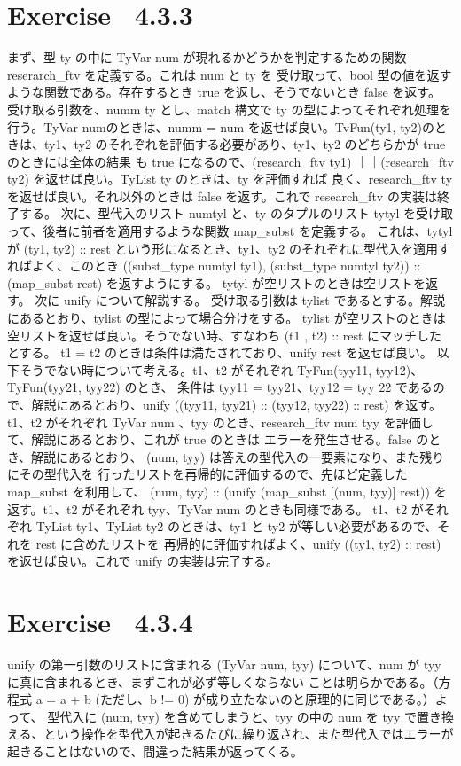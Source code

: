 \documentclass{jreport}
\begin{document}
\section{Exercise \ 4.3.3}
まず、型 ty の中に TyVar num が現れるかどうかを判定するための関数 reserarch\_ftv を定義する。これは num と ty を
受け取って、bool 型の値を返すような関数である。存在するとき true を返し、そうでないとき false を返す。
受け取る引数を、numm ty とし、match 構文で ty の型によってそれぞれ処理を行う。TyVar numのときは、numm = num を返せば良い。TvFun(ty1, ty2)のときは、ty1、ty2 のそれぞれを評価する必要があり、ty1、ty2 のどちらかが true のときには全体の結果
も true になるので、(research\_ftv ty1) ｜｜(research\_ftv ty2) を返せば良い。TyList ty のときは、ty を評価すれば
良く、research\_ftv ty を返せば良い。それ以外のときは false を返す。これで research\_ftv の実装は終了する。
次に、型代入のリスト numtyl と、ty のタプルのリスト tytyl を受け取って、後者に前者を適用するような関数 map\_subst を定義する。
これは、tytyl が (ty1, ty2) :: rest という形になるとき、ty1、ty2 のそれぞれに型代入を適用すればよく、このとき
((subst\_type numtyl ty1), (subst\_type numtyl ty2)) :: (map\_subst rest) を返すようにする。
 tytyl が空リストのときは空リストを返す。
次に unify について解説する。
受け取る引数は tylist であるとする。解説にあるとおり、tylist の型によって場合分けをする。
tylist が空リストのときは空リストを返せば良い。そうでない時、すなわち (t1 , t2) :: rest にマッチしたとする。
t1 = t2 のときは条件は満たされており、unify rest を返せば良い。
以下そうでない時について考える。t1、t2 がそれぞれ TyFun(tyy11, tyy12)、TyFun(tyy21, tyy22) のとき、
条件は tyy11 = tyy21、tyy12 = tyy 22 であるので、解説にあるとおり、unify ((tyy11, tyy21) :: (tyy12, tyy22) :: rest)
を返す。
t1、t2 がそれぞれ TyVar num 、tyy のとき、research\_ftv num tyy を評価して、解説にあるとおり、これが true のときは
エラーを発生させる。false のとき、解説にあるとおり、 (num, tyy) は答えの型代入の一要素になり、また残りにその型代入を
行ったリストを再帰的に評価するので、先ほど定義した map\_subst を利用して、
(num, tyy) :: (unify (map\_subst [(num, tyy)] rest))
を返す。t1、t2 がそれぞれ tyy、TyVar num のときも同様である。
t1、t2 がそれぞれ TyList ty1、TyList ty2 のときは、ty1 と ty2 が等しい必要があるので、それを rest に含めたリストを
再帰的に評価すればよく、unify ((ty1, ty2) :: rest) を返せば良い。これで unify の実装は完了する。
\section{Exercise \ 4.3.4}
unify の第一引数のリストに含まれる (TyVar num, tyy) について、num が tyy に真に含まれるとき、まずこれが必ず等しくならない
ことは明らかである。（方程式 a = a + b (ただし、b != 0) が成り立たないのと原理的に同じである。）よって、
型代入に (num, tyy) を含めてしまうと、tyy の中の num を tyy で置き換える、という操作を型代入が起きるたびに繰り返され、また型代入ではエラーが起きることはないので、間違った結果が返ってくる。
\end{document}
